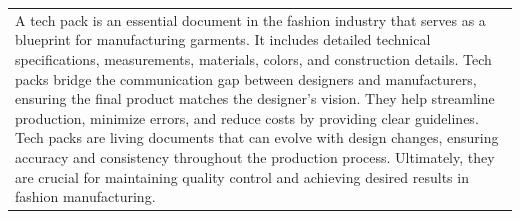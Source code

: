 \documentclass[landscape]{article}
\begin{document}
\newpage
\noindent\begin{tabularx}{\textwidth}{|X|}
\hline
\rowcolor{headerblue}\multicolumn{1}{|c|}{\textcolor{white}{\textbf{ABOUT TECH PACKS}}} \\
\hline
A tech pack is an essential document in the fashion industry that serves as a blueprint for manufacturing garments. It includes detailed technical specifications, measurements, materials, colors, and construction details. Tech packs bridge the communication gap between designers and manufacturers, ensuring the final product matches the designer's vision. They help streamline production, minimize errors, and reduce costs by providing clear guidelines. Tech packs are living documents that can evolve with design changes, ensuring accuracy and consistency throughout the production process. Ultimately, they are crucial for maintaining quality control and achieving desired results in fashion manufacturing.
\end{tabularx}
\hline
\end{document}
